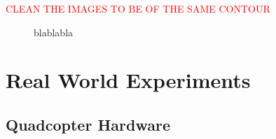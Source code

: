 \textcolor{red}{CLEAN THE IMAGES TO BE OF THE SAME CONTOUR}

\begin{figure}[t]
\centering
{}

\caption{blablabla}
\label{fig:whatever}
\end{figure}



\section{Real World Experiments} \label{real_robot}

\subsection{Quadcopter Hardware}\label{real_robot_hardware}

